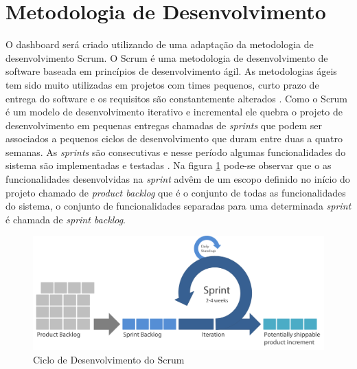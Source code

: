 \section{Metodologia de Desenvolvimento}
\label{met_desenvolvimento}
O dashboard será criado utilizando de uma adaptação da metodologia de desenvolvimento Scrum. O Scrum é uma metodologia de desenvolvimento de software baseada em princípios de desenvolvimento ágil. As metodologias ágeis tem sido muito utilizadas em projetos 	com times pequenos, curto prazo de entrega do software e os requisitos são constantemente alterados \cite{lopez-martinez_problems_2016}. Como o Scrum é um modelo de desenvolvimento iterativo e incremental ele quebra o projeto de desenvolvimento em pequenas entregas chamadas de \textit{sprints} que podem ser associados a pequenos ciclos de desenvolvimento que duram entre duas a quatro semanas. As \textit{sprints} são consecutivas e nesse período algumas funcionalidades do sistema são implementadas e testadas \cite{pagotto_scrum_2016}. Na figura \ref{img:scrum} pode-se observar que o as funcionalidades desenvolvidas na \textit{sprint} advêm de um escopo definido no início do projeto chamado de \textit{product backlog} que é o conjunto de todas as funcionalidades do sistema, o conjunto de funcionalidades separadas para uma determinada \textit{sprint} é chamada de \textit{sprint backlog}\cite{sabbagh_scrum:_2014}.
\graphicspath{{figuras/}}
\begin{figure}[h]
\centering
\includegraphics[scale=0.40]{scrum}
\caption{Ciclo de Desenvolvimento do Scrum}
\label{img:scrum}
\end{figure}

